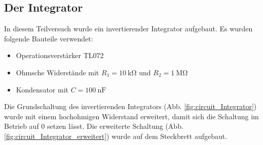 %
\subsection{Der Integrator}
%
In diesem Teilversuch wurde ein invertierender Integrator aufgebaut.
Es wurden folgende Bauteile verwendet:
%
\begin{itemize}
    \item Operationsverstärker TL072
    \item Ohmsche Widerstände mit $R_1=\SI{10}{\kilo\ohm}$ und $R_2=\SI{1}{\mega\ohm}$  %
    \item Kondensator mit $C=\SI{100}{\nano\farad}$
\end{itemize}
    
 Die Grundschaltung des invertierenden Integrators (Abb. \ref{fig:circuit_Integrator}) wurde mit einem hochohmigen Widerstand erweitert, damit sich die Schaltung im Betrieb auf 0 setzen lässt. Die erweiterte Schaltung (Abb. \ref{fig:circuit_Integrator_erweitert}) wurde auf dem Steckbrett aufgebaut.
 
